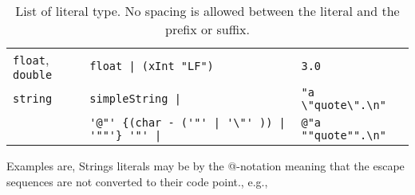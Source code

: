 \begin{table}
\begin{tabular}{|l|l|l|}
    \lstinline!float!, \lstinline!double! & \lstinline[language=ebnf]!float | (xInt "LF")!  & \lstinline!3.0!  \\
    \lstinline!string! & \lstinline[language=ebnf]!simpleString |! & \lstinline!"a \"quote\".\n"!  \\
         & \lstinline[language=ebnf]!'@"' {(char - ('"' | '\"' )) | '""'} '"' |!&\lstinline!@"a ""quote"".\n"! \\
    \hline
  \end{tabular}
  \caption{List of literal type. No spacing is allowed between the literal and the prefix or suffix. 
  }
  \label{tab:literalTypes}
\end{table}
Examples are,
%
Strings literals may be  by the @-notation%
meaning that the escape sequences are not converted to their code point., e.g.,
%
%

